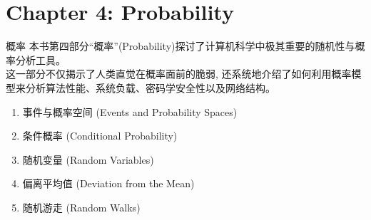 \documentclass[12pt, a4paper, UTF8]{ctexart}
\begin{document}
\begin{sloppypar}
    \section{Chapter 4: Probability}
    \begin{chaptersummary}{概率}
        本书第四部分“概率”(Probability)探讨了计算机科学中极其重要的随机性与概率分析工具。\\
        这一部分不仅揭示了人类直觉在概率面前的脆弱, 还系统地介绍了如何利用概率模型来分析算法性能、系统负载、密码学安全性以及网络结构。
        \tcbline %
        \begin{enumerate}[nosep]
            \item 事件与概率空间 (Events and Probability Spaces)
            \item 条件概率 (Conditional Probability)
            \item 随机变量 (Random Variables)
            \item 偏离平均值 (Deviation from the Mean)
            \item 随机游走 (Random Walks)
        \end{enumerate}
    \end{chaptersummary}


\end{sloppypar}
\end{document}
